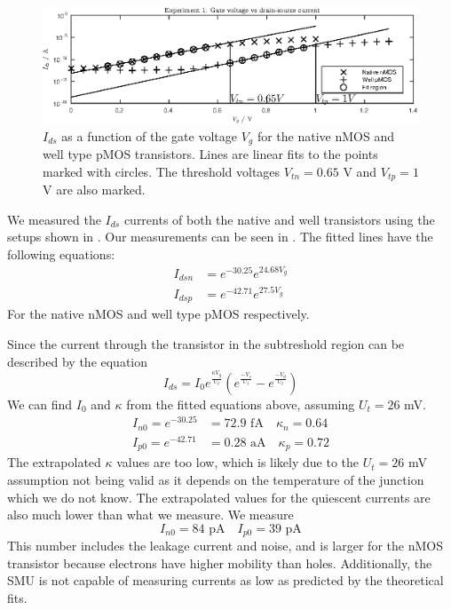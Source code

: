 \begin{figure}
    \center
    \includegraphics{ex1.eps}
    \caption{\(I_{ds}\) as a function of the gate voltage \(V_g\) for the native nMOS and well type pMOS transistors. Lines are linear fits
    to the points marked with circles. The threshold voltages \(V_{tn}=0.65\) V and \(V_{tp} = 1\) V are also marked.}
    \label{fig:ex1}
\end{figure}
We measured the \(I_{ds}\) currents of both the native and well transistors using the setups shown in . Our measurements 
can be seen in . The fitted lines have the following equations:
\begin{align*}
    I_{dsn} & = e^{-30.25}e^{24.68V_g} \\
    I_{dsp} & = e^{-42.71}e^{27.5V_g} 
\end{align*}
For the native nMOS and well type pMOS respectively.

Since the current through the transistor in the subtreshold region can be described by the equation
\begin{equation*}
    I_{ds} = I_0e^{\frac{\kappa V_g}{U_t}}\left(e^{\frac{-V_s}{U_t}}-e^{\frac{-V_d}{U_t}}\right)
\end{equation*}
We can find \(I_0\) and \(\kappa\) from the fitted equations above, assuming \(U_t=26\) mV.
\begin{align*}
    I_{n0} = e^{-30.25} & = 72.9\text{ fA} \quad \kappa_n = 0.64 \\
    I_{p0} = e^{-42.71} & = 0.28\text{ aA} \quad \kappa_p = 0.72
\end{align*}
The extrapolated \(\kappa\) values are too low, which is likely due to the \(U_t=26\) mV assumption not being valid as it
depends on the temperature of the junction which we do not know. The extrapolated values for the quiescent currents are also 
much lower than what we measure. We measure 
\begin{equation*}
    I_{n0} = 84 \text{ pA} \quad I_{p0} = 39 \text{ pA}
\end{equation*}
This number includes the leakage current and noise, and is larger for the nMOS transistor because electrons have higher mobility than holes.
Additionally, the SMU is not capable of measuring currents as low as predicted by the theoretical fits.

